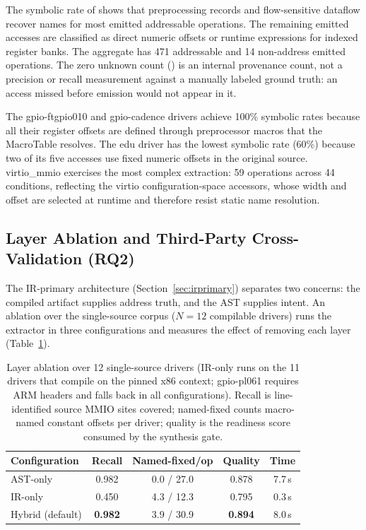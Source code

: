 The symbolic rate of \EvalSymbolicPct{} shows that preprocessing records and
flow-sensitive dataflow recover names for most emitted addressable operations.
The remaining emitted accesses are classified as \EvalFixed{} direct numeric
offsets or \EvalComputed{} runtime expressions for indexed register banks.
The aggregate has 471 addressable and 14 non-address emitted operations. The
zero unknown count (\EvalUnknown{}) is an internal provenance count, not a
precision or recall measurement against a manually labeled ground truth: an
access missed before emission would not appear in it.

The gpio-ftgpio010 and gpio-cadence drivers achieve 100\% symbolic rates
because all their register offsets are defined through preprocessor macros
that the MacroTable resolves. The edu driver has the lowest symbolic rate
(60\%) because two of its five accesses use fixed numeric offsets in the
original source. virtio\_mmio exercises the most complex extraction: 59
operations across 44 conditions, reflecting the virtio configuration-space
accessors, whose width and offset are selected at runtime and therefore
resist static name resolution.

\subsection{Layer Ablation and Third-Party Cross-Validation (RQ2)}
\label{sec:ablation}

The IR-primary architecture (Section~\ref{sec:irprimary}) separates two concerns: the
compiled artifact supplies address truth, and the AST supplies intent. An
ablation over the single-source corpus ($N{=}12$ compilable drivers) runs
the extractor in three configurations and measures the effect of removing
each layer (Table~\ref{tab:ablation}).

\begin{table}[t]
\centering
\caption{Layer ablation over 12 single-source drivers (IR-only runs on the
11 drivers that compile on the pinned x86 context; gpio-pl061 requires ARM
headers and falls back in all configurations). Recall is line-identified
source MMIO sites covered; named-fixed counts macro-named constant offsets
per driver; quality is the readiness score consumed by the synthesis gate.}
\label{tab:ablation}
\small
\begin{tabular}{lcccc}
\toprule
Configuration & Recall & Named-fixed/op & Quality & Time \\
\midrule
AST-only & 0.982 & 0.0 / 27.0 & 0.878 & 7.7\,s \\
IR-only & 0.450 & 4.3 / 12.3 & 0.795 & 0.3\,s \\
Hybrid (default) & \textbf{0.982} & 3.9 / 30.9 & \textbf{0.894} & 8.0\,s \\
\bottomrule
\end{tabular}
\end{table}

